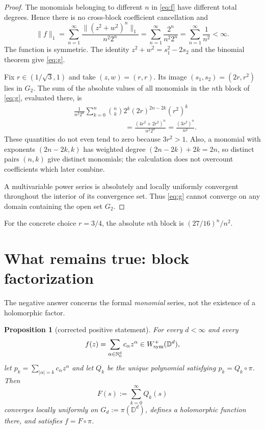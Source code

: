 \documentclass[11pt]{article}
\newtheorem{proposition}{Proposition}
\newcommand{\D}{\mathbb D}
\newcommand{\N}{\mathbb N}
\begin{document}
\begin{proof}
The monomials belonging to different $n$ in \eqref{eq:f} have different
total degrees.  Hence there is no cross-block coefficient cancellation and
\[
 \|f\|_1=\sum_{n=1}^{\infty}
 \frac{\|(z^2+w^2)^n\|_1}{n^2 2^n}
 =\sum_{n=1}^{\infty}\frac{2^n}{n^2 2^n}
 =\sum_{n=1}^{\infty}\frac1{n^2}<\infty.
\]
The function is symmetric.  The identity
$z^2+w^2=s_1^2-2s_2$ and the binomial theorem give \eqref{eq:g}.

Fix $r\in(1/\sqrt3,1)$ and take $(z,w)=(r,r)$.  Its image
$(s_1,s_2)=(2r,r^2)$ lies in $G_2$.  The sum of the absolute values of
all monomials in the $n$th block of \eqref{eq:g}, evaluated there, is
\begin{align*}
 &\frac1{n^2 2^n}\sum_{k=0}^n\binom nk
 2^k(2r)^{2n-2k}(r^2)^k\\
 &\hspace{3cm}=\frac{(4r^2+2r^2)^n}{n^2 2^n}
 =\frac{(3r^2)^n}{n^2}.
\end{align*}
These quantities do not even tend to zero because $3r^2>1$.
Also, a monomial with exponents $(2n-2k,k)$ has weighted degree
$(2n-2k)+2k=2n$, so distinct pairs $(n,k)$ give distinct monomials;
the calculation does not overcount coefficients which later combine.

A multivariable power series is absolutely and locally uniformly convergent
throughout the interior of its convergence set.  Thus \eqref{eq:g} cannot
converge on any domain containing the open set $G_2$.
\end{proof}

For the concrete choice $r=3/4$, the absolute $n$th block is
$(27/16)^n/n^2$.

\section*{What remains true: block factorization}

The negative answer concerns the formal \emph{monomial} series, not the
existence of a holomorphic factor.

\begin{proposition}[corrected positive statement]\label{prop:block}
For every $d<\infty$ and every
\[
 f(z)=\sum_{\alpha\in\N_0^d}c_\alpha z^\alpha
 \in W^+_{\rm sym}(\D^d),
\]
let $p_k=\sum_{|\alpha|=k}c_\alpha z^\alpha$ and let $Q_k$ be the
unique polynomial satisfying $p_k=Q_k\circ\pi$.  Then
\[
 F(s):=\sum_{k=0}^{\infty}Q_k(s)
\]
converges locally uniformly on $G_d:=\pi(\D^d)$, defines a holomorphic
function there, and satisfies $f=F\circ\pi$.
\end{proposition}
\end{document}
